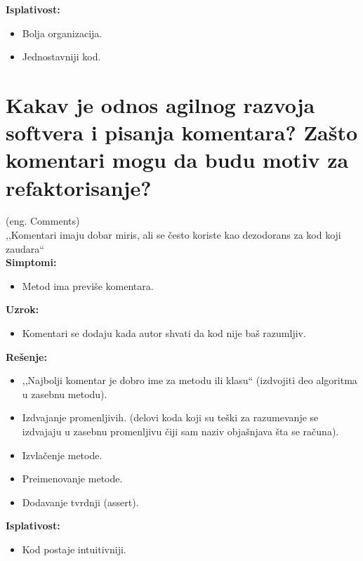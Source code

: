 \documentclass[a4paper]{article}
\begin{document}
  \noindent \textbf{Isplativost:} 
  \begin{itemize}
    \item Bolja organizacija.
    \item Jednostavniji kod.
  \end{itemize}  

\section{Kakav je odnos agilnog razvoja softvera i pisanja komentara? 
         Zašto komentari mogu da budu motiv za refaktorisanje?}
  (eng. Comments)\\
  ,,Komentari imaju dobar miris, ali se često koriste
    kao dezodorans za kod koji zaudara``\\
  \textbf{Simptomi:}
  \begin{itemize}
    \item Metod ima previše komentara.
  \end{itemize}

  \noindent \textbf{Uzrok:} 
  \begin{itemize}
    \item Komentari se dodaju kada autor shvati da kod nije baš razumljiv.
  \end{itemize}

  \noindent \textbf{Rešenje:} 
  \begin{itemize}
    \item ,,Najbolji komentar je dobro ime za metodu ili klasu`` (izdvojiti deo algoritma
          u zasebnu metodu).
    \item Izdvajanje promenljivih. (delovi koda koji su teški za razumevanje se izdvajaju
          u zasebnu promenljivu čiji sam naziv objašnjava šta se računa).
    \item Izvlačenje metode.
    \item Preimenovanje metode.
    \item Dodavanje tvrdnji (assert).
  \end{itemize}

  \noindent \textbf{Isplativost:} 
  \begin{itemize}
    \item Kod postaje intuitivniji.
  \end{itemize}  
  
\end{document}
